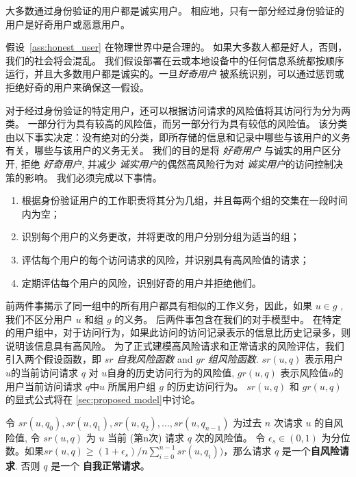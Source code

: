 \begin{assumption}
	\label{ass:honest_user}
	大多数通过身份验证的用户都是诚实用户。 相应地，只有一部分经过身份验证的用户是好奇用户或恶意用户。
\end{assumption}

假设~\ref{ass:honest_user} 在物理世界中是合理的。 如果大多数人都是好人，否则，我们的社会将会混乱。 我们假设部署在云或本地设备中的任何信息系统都按顺序运行，并且大多数用户都是诚实的。一旦\emph{好奇用户} 被系统识别，可以通过惩罚或拒绝好奇的用户来确保这一假设。

对于经过身份验证的特定用户，还可以根据访问请求的风险值将其访问行为分为两类。 一部分行为具有较高的风险值，而另一部分行为具有较低的风险值。 该分类由以下事实决定：没有绝对的分类，即所存储的信息和记录中哪些与该用户的义务有关，哪些与该用户的义务无关。 我们的目的是将 \emph{好奇用户} 与诚实的用户区分开, 拒绝 \emph{好奇用户}, 并减少 \emph{诚实用户}的偶然高风险行为对 \emph{诚实用户}的访问控制决策的影响。 我们必须完成以下事情。
\begin{enumerate}
	\item 根据身份验证用户的工作职责将其分为几组，并且每两个组的交集在一段时间内为空；
	\item 识别每个用户的义务更改，并将更改的用户分别分组为适当的组；
	\item 评估每个用户的每个访问请求的风险，并识别具有高风险值的请求；
	\item 定期评估每个用户的风险，识别好奇的用户并拒绝他们。
\end{enumerate}

前两件事揭示了同一组中的所有用户都具有相似的工作义务，因此，如果 $u \in g$ ,我们不区分用户 $u$ 和组 $g$ 的义务。 后两件事包含在我们的对手模型中。 在特定的用户组中，对于访问行为，如果此访问的访问记录表示的信息比历史记录多，则说明该信息具有高风险。 为了正式建模高风险请求和正常请求的风险评估，我们引入两个假设函数，即 $sr$ \emph{自我风险函数} and $gr$ \emph{组风险函数}. $sr(u,q)$ 表示用户 $u$的当前访问请求 $q$ 对 $u$自身的历史访问行为的风险值,  $gr(u,q)$ 表示风险值$u$的用户当前访问请求 $q$中$u$ 所属用户组 $g$ 的历史访问行为。  $sr(u,q)$ 和 $gr(u,q)$ 的显式公式将在 \ref{sec:proposed model}中讨论。

\begin{definition}%
	\label{def_self_risky}
	令 $sr(u, q_0), sr(u, q_1), sr(u, q_2), ... ,sr(u, q_{n-1})$ 为过去 $n$ 次请求 $u$ 的自风险值, 令 $sr(u,q)$ 为 $u$ 当前 (第n次) 请求 $q$ 次的风险值。 令 $\epsilon_s \in (0,1)$ 为分位数。如果$sr(u,q) \geq  (1+\epsilon_s) / n  \sum ^{n-1}_{i=0}{sr(u,q_i))}$，那么请求 $q$ 是一个\textbf{自风险请求}. 否则 $q$ 是一个 \textbf{自我正常请求}。
\end{definition}

